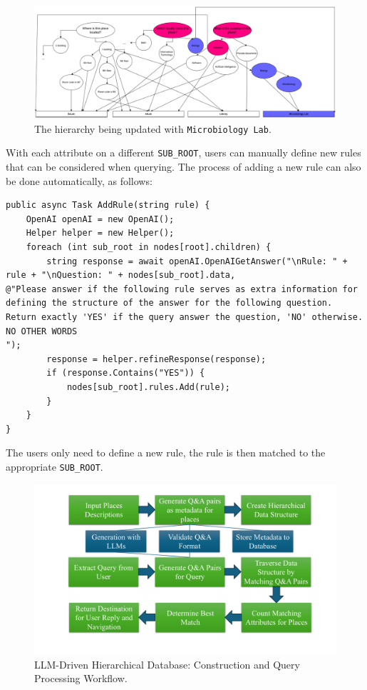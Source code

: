 \begin{figure}[ht]
  \centering
  \includegraphics[scale=0.15]{content/resources/images/chap-problems-solutions/data-management-9.png}
  \caption{The hierarchy being updated with \texttt{Microbiology Lab}.}
  \label{fig:data-management-9}
\end{figure}

\label{subsubsubsub:rules}
With each attribute on a different \texttt{SUB\_ROOT}, users can manually define new rules that can be considered when querying. The process of adding a new rule can also be done automatically, as follows:
\begin{lstlisting}[style=cSharp]
public async Task AddRule(string rule) {
    OpenAI openAI = new OpenAI();
    Helper helper = new Helper();
    foreach (int sub_root in nodes[root].children) {
        string response = await openAI.OpenAIGetAnswer("\nRule: " + rule + "\nQuestion: " + nodes[sub_root].data, 
@"Please answer if the following rule serves as extra information for defining the structure of the answer for the following question.
Return exactly 'YES' if the query answer the question, 'NO' otherwise.
NO OTHER WORDS
");
        response = helper.refineResponse(response);
        if (response.Contains("YES")) {
            nodes[sub_root].rules.Add(rule);
        }
    }
}
\end{lstlisting}

The users only need to define a new rule, the rule is then matched to the appropriate \texttt{SUB\_ROOT}.

\begin{figure}[ht]
  \centering
  \includegraphics[scale=0.5]{content/resources/images/chap-problems-solutions/data-management-0.png}
  \caption{LLM-Driven Hierarchical Database: Construction and Query Processing Workflow.}
  \label{fig:data-management-0}
\end{figure}
